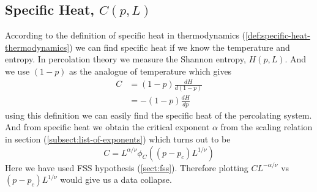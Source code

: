 	\subsection{Specific Heat, $C(p,L)$}
	\label{subsect.percolation.specific-heat}
	According to the definition of specific heat in thermodynamics (\ref{def:specific-heat-thermodynamics})  we can find specific heat if we know the temperature and entropy. In percolation theory we measure the Shannon entropy, $H(p,L)$. And we use $(1-p)$ as the analogue of temperature which gives
	\begin{align}
		C &= (1-p) \frac{dH}{d(1-p)} \\
		  &= -(1-p) \frac{dH}{dp}
		  \label{def:specific-heat-percolation}
	\end{align}
	using this definition we can easily find the specific heat of the percolating system. And from specific heat we obtain the critical exponent $\alpha$ from the scaling relation in section (\ref{subsect:list-of-exponents}) which turns out to be
	\begin{equation}
		C = L^{\alpha/\nu} \phi_C(\left(p-p_c\right)L^{1/\nu})
	\end{equation}
	Here we have used FSS hypothesis (\ref{sect:fss}).
	Therefore plotting $C L^{-\alpha/\nu}$ vs $\left(p-p_c\right)L^{1/\nu}$ would give us a data collapse.
			
	
